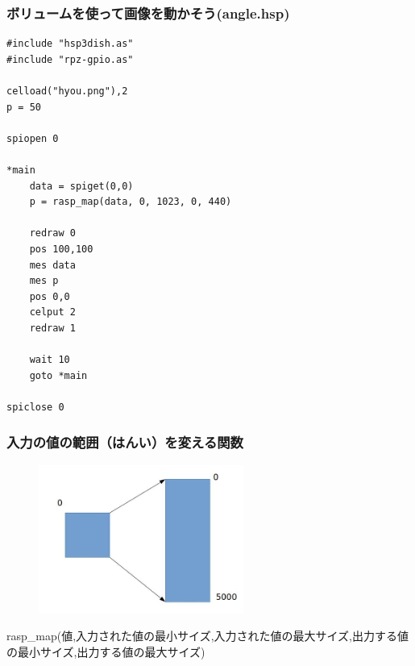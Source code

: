 \begin{frame}[fragile]
    \frametitle{ボリュームを使って画像を動かそう(angle.hsp)}
\begin{lstlisting}
#include "hsp3dish.as"
#include "rpz-gpio.as"

celload("hyou.png"),2
p = 50

spiopen 0

*main
	data = spiget(0,0)
	p = rasp_map(data, 0, 1023, 0, 440)

	redraw 0
	pos 100,100
	mes data
	mes p
	pos 0,0
	celput 2
	redraw 1

	wait 10	
	goto *main

spiclose 0
\end{lstlisting}
\end{frame}

\begin{frame}[fragile]
    \frametitle{入力の値の範囲（はんい）を変える関数}
    \begin{center}
        \begin{figure}
            \includegraphics[width=0.6\textwidth]{images/slide/rasp_map.jpg}
        \end{figure}
        {rasp\_map(値,入力された値の最小サイズ,入力された値の最大サイズ,出力する値の最小サイズ,出力する値の最大サイズ)}
    \end{center}
\end{frame}


